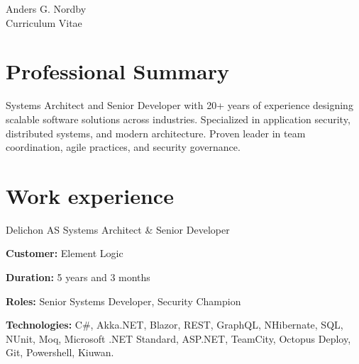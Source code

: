 \documentclass[10pt]{article} %
\begin{document}
\begin{paracol}{2} %


\parbox[top][0.12\textheight][c]{\linewidth}{ %
	\vspace{-0.04\textheight} %
	\centering %
	{\sffamily\Huge Anders G. Nordby}\\\medskip %
	{\Huge\color{headings}\cvtextfont Curriculum Vitae}
}


\section{Professional Summary}

Systems Architect and Senior Developer with 20+ years of experience designing scalable software solutions across industries. Specialized in application security, distributed systems, and modern architecture. Proven leader in team coordination, agile practices, and security governance.


\section{Work experience} 

{}
{Delichon AS} 
{Systems Architect \& Senior Developer} 
{
\textbf{Customer:} Element Logic

\textbf{Duration:} 5 years and 3 months

\textbf{Roles:} Senior Systems Developer, Security Champion

\textbf{Technologies:} C\#, Akka.NET, Blazor, REST, GraphQL, NHibernate, SQL, NUnit, Moq, Microsoft .NET Standard, ASP.NET, TeamCity, Octopus Deploy, Git, Powershell, Kiuwan.
 
}
\end{paracol}
\end{document}
